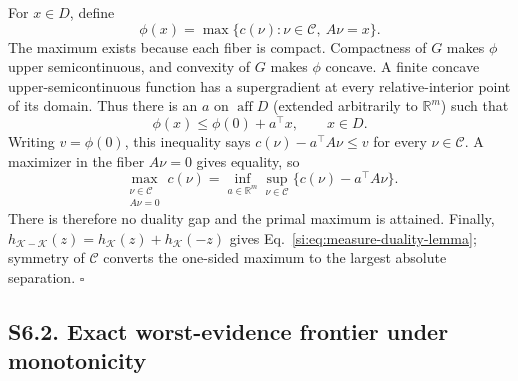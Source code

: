 For $x\in D$, define
\begin{equation*}
\phi(x)=\max\{c(\nu):\nu\in\mathcal C,\ A\nu=x\}.
\end{equation*}
The maximum exists because each fiber is compact. Compactness of $G$ makes
$\phi$ upper semicontinuous, and convexity of $G$ makes $\phi$ concave. A
finite concave upper-semicontinuous function has a supergradient at every
relative-interior point of its domain. Thus there is an $a$ on
$\operatorname{aff}D$ (extended arbitrarily to $\mathbb R^m$) such that
\begin{equation*}
\phi(x)\le\phi(0)+a^\top x,\qquad x\in D.
\end{equation*}
Writing $v=\phi(0)$, this inequality says
$c(\nu)-a^\top A\nu\le v$ for every $\nu\in\mathcal C$. A maximizer in the
fiber $A\nu=0$ gives equality, so
\begin{equation}
\max_{\substack{\nu\in\mathcal C\\A\nu=0}}c(\nu)
=\inf_{a\in\mathbb R^m}\sup_{\nu\in\mathcal C}
\{c(\nu)-a^\top A\nu\}.
\label{si:eq:equality-lagrange}
\end{equation}
There is therefore no duality gap and the primal maximum is attained. Finally,
$h_{\mathcal K-\mathcal K}(z)=h_{\mathcal K}(z)+h_{\mathcal K}(-z)$ gives
Eq.~\ref{si:eq:measure-duality-lemma}; symmetry of $\mathcal C$ converts the
one-sided maximum to the largest absolute separation. \hfill$\square$

\subsection*{S6.2. Exact worst-evidence frontier under monotonicity}

